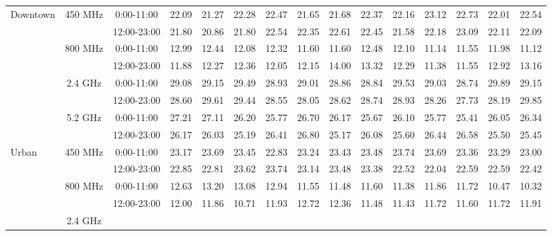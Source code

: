 \begin{table}
\centering %
\begin{tabular}{|l|c|c|c|c|c|c|c|c|c|c|c|c|c|c|} %
\hline %
\multirow{8}{*}{Downtown}	
&\multirow{2}{*}{450 MHz}	
&0:00-11:00 &  22.09 &  21.27 &  22.28 &  22.47 &  21.65 &  21.68&  22.37 &  22.16&  23.12 &  22.73&  22.01 &  22.54 \\ 	
\cline{3-15}	
&&12:00-23:00&  21.80 &  20.86 &  21.80 &  22.54 &  22.35 &  22.61&  22.45 &  21.58&  22.18 &  23.09&  22.11 &  22.09 \\ 	
\cline{2-15}	
&\multirow{2}{*}{800 MHz}	
&0:00-11:00 &  12.99 &  12.44 &  12.08 &  12.32 &  11.60 &  11.60&  12.48 &  12.10&  11.14 &  11.55&  11.98 &  11.12 \\ 	
\cline{3-15}	
&&12:00-23:00&  11.88 &  12.27 &  12.36 &  12.05 &  12.15 &  14.00&  13.32 &  12.29&  11.38 &  11.55&  12.92 &  13.16 \\ 	
\cline{2-15}	
&\multirow{2}{*}{2.4 GHz}	
&0:00-11:00 &  29.08 &  29.15 &  29.49 &  28.93 &  29.01 &  28.86&  28.84 &  29.53&  29.03 &  28.74&  29.89 &  29.15 \\ 	
\cline{3-15}	
&&12:00-23:00&  28.60 &  29.61 &  29.44 &  28.55 &  28.05 &  28.62&  28.74 &  28.93&  28.26 &  27.73&  28.19 &  29.85 \\ 	
\cline{2-15}	
&\multirow{2}{*}{5.2 GHz}	
&0:00-11:00 &  27.21 &  27.11 &  26.20 &  25.77 &  26.70 &  26.17&  25.67 &  26.10&  25.77 &  25.41&  26.05 &  26.34 \\ 	
\cline{3-15}	
&&12:00-23:00&  26.17 &  26.03 &  25.19 &  26.41 &  26.80 &  25.17&  26.08 &  25.60&  26.44 &  26.58&  25.50 &  25.45 \\ 	
\hline	
\multirow{8}{*}{Urban}	
&\multirow{2}{*}{450 MHz}	
&0:00-11:00 &  23.17 &  23.69 &  23.45 &  22.83 &  23.24 &  23.43&  23.48 &  23.74&  23.69 &  23.36&  23.29 &  23.00 \\ 	
\cline{3-15}	
&&12:00-23:00&  22.85 &  22.81 &  23.62 &  23.74 &  23.14 &  23.48&  23.38 &  22.52&  22.04 &  22.59&  22.59 &  22.42 \\ 	
\cline{2-15}	
&\multirow{2}{*}{800 MHz}	
&0:00-11:00 &  12.63 &  13.20 &  13.08 &  12.94 &  11.55 &  11.48&  11.60 &  11.38&  11.86 &  11.72&  10.47 &  10.32 \\ 	
\cline{3-15}	
&&12:00-23:00&  12.00 &  11.86 &  10.71 &  11.93 &  12.72 &  12.36&  11.48 &  11.43&  11.72 &  11.60&  11.72 &  11.91 \\ 	
\cline{2-15}	
&\multirow{2}{*}{2.4 GHz}	

\end{tabular}
\end{table}
